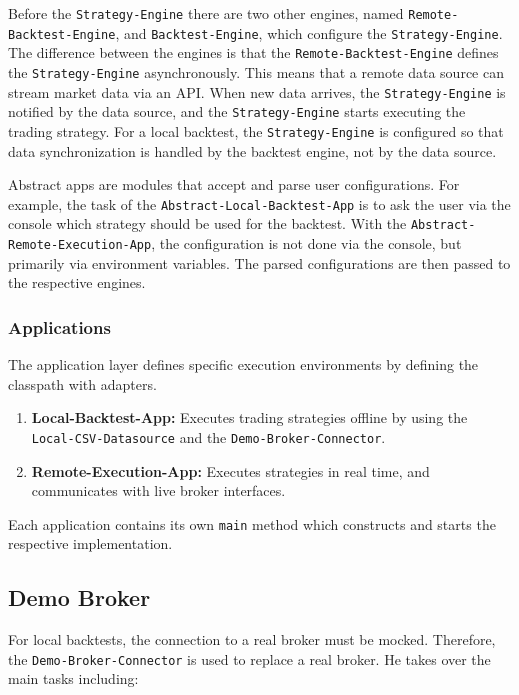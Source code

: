 \noindent
Before the \verb|Strategy-Engine| there are two other engines, named \verb|Remote-Backtest-Engine|, and \verb|Backtest-Engine|, which configure the \verb|Strategy-Engine|.
The difference between the engines is that the \verb|Remote-Backtest-Engine| defines the \verb|Strategy-Engine| asynchronously.
This means that a remote data source can stream market data via an API.
When new data arrives, the \verb|Strategy-Engine| is notified by the data source, and the \verb|Strategy-Engine| starts executing the trading strategy.
For a local backtest, the \verb|Strategy-Engine| is configured so that data synchronization is handled by the backtest engine, not by the data source.

Abstract apps are modules that accept and parse user configurations.
For example, the task of the \verb|Abstract-Local-Backtest-App| is to ask the user via the console which strategy should be used for the backtest.
With the \verb|Abstract-Remote-Execution-App|, the configuration is not done via the console, but primarily via environment variables.
The parsed configurations are then passed to the respective engines.

\subsubsection{Applications}

The application layer defines specific execution environments by defining the classpath with adapters.

\begin{enumerate}
    \item \textbf{Local-Backtest-App:} Executes trading strategies offline by using the \verb|Local-CSV-Datasource| and the \verb|Demo-Broker-Connector|.
    \item \textbf{Remote-Execution-App:} Executes strategies in real time, and communicates with live broker interfaces.
\end{enumerate}

\noindent
Each application contains its own \verb|main| method which constructs and starts the respective implementation.

\subsection{Demo Broker}

For local backtests, the connection to a real broker must be mocked.
Therefore, the \verb|Demo-Broker-Connector| is used to replace a real broker.
He takes over the main tasks including:

